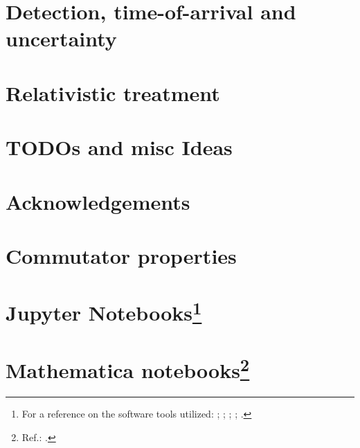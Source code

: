 \chapter{Detection, time-of-arrival and uncertainty}





\chapter{Relativistic treatment}


\iftodo
  \chapter{TODOs and misc Ideas}
  
\fi

\iftodo
  \chapter*{Acknowledgements}

  
\fi

\appendix

\chapter{Commutator properties}


\chapter[Jupyter Notebooks]{Jupyter Notebooks\footnote{
  For a reference on the software tools utilized:
  \cite{comp:scipy};
  \cite{comp:sympy};
  \cite{comp:jupyter};
  \cite{comp:matplotlib};
  \cite{comp:numpy}.
}}



%


\chapter[Mathematica notebooks]{Mathematica notebooks\footnote{
  Ref.: \cite{Wolfram}.
}}



\printbibliography[heading=bibintoc]



